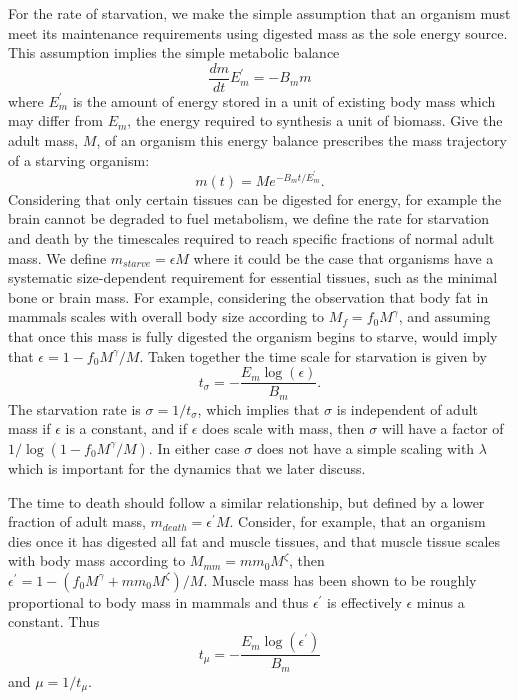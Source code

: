 \documentclass{pnastwo}
\begin{document}
\begin{article}
For the rate of starvation, we make the simple assumption that an organism must meet its maintenance requirements using digested mass as the sole energy source. This assumption implies the simple metabolic balance 
\begin{equation}
\frac{dm}{dt}E_{m}^{\prime}=-B_{m}m
\end{equation}
where $E_{m}^{\prime}$ is the amount of energy stored in a unit of existing body mass which may differ from  $E_{m}$, the energy required to synthesis a unit of biomass. Give the adult mass, $M$, of an organism this energy balance prescribes the mass trajectory of a starving organism:
\begin{equation}
m\left(t\right)=Me^{-B_{m}t/E_{m}^{\prime}}.
\end{equation}
Considering that only certain tissues can be digested for energy, for example the brain cannot be degraded to fuel metabolism, we define the rate for starvation and death by the timescales required to reach specific fractions of normal adult mass. We define $m_{starve}=\epsilon M$ where it could be the case that organisms have a systematic size-dependent requirement for essential tissues, such as the minimal bone or brain mass. For example, considering the observation that body fat in mammals scales with overall body size according to $M_{f}=f_{0}M^{\gamma}$, and assuming that once this mass is fully digested the organism begins to starve, would imply that $\epsilon=1-f_{0}M^{\gamma}/M$. Taken together the time scale for starvation is given by
\begin{equation}\label{eq:sigma}
t_{\sigma}=-\frac{E_{m}\log\left(\epsilon\right)}{B_{m}}.
\end{equation}
The starvation rate is $\sigma=1/t_{\sigma}$, which implies that $\sigma$ is independent of adult mass if $\epsilon$ is a constant, and if $\epsilon$ does scale with mass, then $\sigma$ will have a factor of $1/\log\left(1-f_{0}M^{\gamma}/M\right)$. In either case $\sigma$ does not have a simple scaling with $\lambda$ which is important for the dynamics that we later discuss. 

The time to death should follow a similar relationship, but defined by a lower fraction of adult mass, $m_{death}=\epsilon^{\prime} M$. Consider, for example, that an organism dies once it has digested all fat and muscle tissues, and that muscle tissue scales with body mass according to $M_{mm}=mm_{0}M^{\zeta}$, then $\epsilon^{\prime}=1-\left(f_{0}M^{\gamma}+mm_{0}M^{\zeta}\right)/M$. Muscle mass has been shown to be roughly proportional to body mass \cite{muscle} in mammals and thus  $\epsilon^{\prime}$ is effectively $\epsilon$ minus a constant. Thus
\begin{equation}
t_{\mu}=-\frac{E_{m}\log\left(\epsilon^{\prime}\right)}{B_{m}}
\end{equation}
and $\mu=1/t_{\mu}$. 


\end{article}
\end{document}
